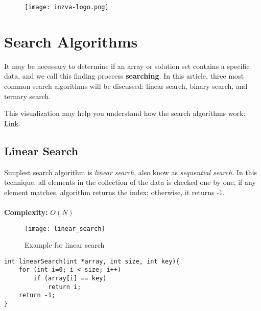 \documentclass[12pt]{article}
\title{\vspace{-2em}\mytitle\vspace{-0.3em}}
\author{
	\textbf{Editor}\\
	Kadir Emre Oto  \\ \ \\ 
	\textbf{Reviewers} \\ 
	Muhammed Burak Buğrul  \\
	Tahsin Enes Kuru \\ \ \\
    \textbf{Contributors} \\ 
	Aybala Karakaya  \\
}
\date{}
\begin{document}
	
	\begin{figure}
		\centering
		\texttt{[image: inzva-logo.png]}
		\label{fig:inzva}
	\end{figure}
	\maketitle
	
	\cleardoublepage
	\tableofcontents
	\cleardoublepage
	
	\section{Search Algorithms}
	
It may be necessary to determine if an array or solution set contains a specific data, and we call this finding proccess \textbf{searching}. In this article, three most common search algorithms will be discussed: linear search, binary search, and ternary search.

This visualization may help you understand how the search algorithms work: \href{https://www.cs.usfca.edu/~galles/visualization/Search.html}{Link}. 

		\subsection{Linear Search}
			
Simplest search algorithm is \textit{linear search}, also know as \textit{sequential search}. In this technique, all elements in the collection of the data is checked one by one, if any element matches, algorithm returns the index; otherwise, it returns -1. \\ \\
\textbf{Complexity: }
    $O(N)$

\begin{figure}[h]
	\centering
	\texttt{[image: linear\_search]}
	\caption{Example for linear search}
	\label{fig:linear_search}
\end{figure}


\begin{verbatim}
int linearSearch(int *array, int size, int key){
    for (int i=0; i < size; i++)
        if (array[i] == key)
            return i;
    return -1;
}
\end{verbatim}

\cleardoublepage
	
\end{document}
